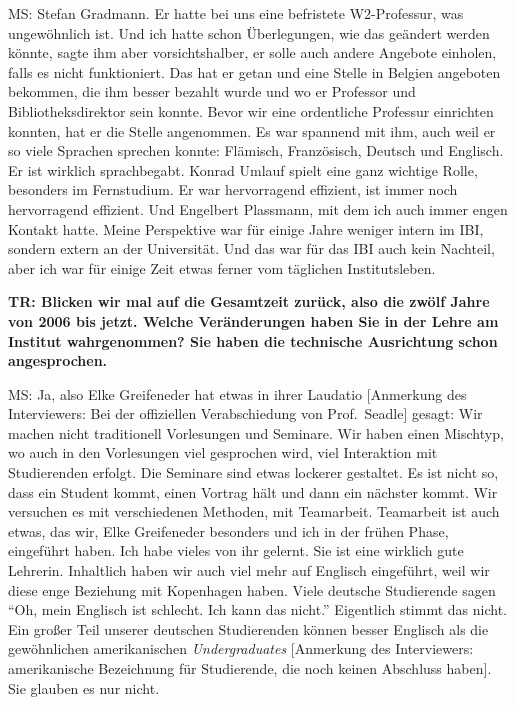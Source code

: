 \documentclass[a4paper,
fontsize=11pt,
oneside,
numbers=noperiodatend,
parskip=half-,
bibliography=totoc,
final
]{scrartcl}
\begin{document}
MS: Stefan Gradmann. Er hatte bei uns eine befristete W2-Professur, was
ungewöhnlich ist. Und ich hatte schon Überlegungen, wie das geändert
werden könnte, sagte ihm aber vorsichtshalber, er solle auch andere
Angebote einholen, falls es nicht funktioniert. Das hat er getan und
eine Stelle in Belgien angeboten bekommen, die ihm besser bezahlt wurde
und wo er Professor und Bibliotheksdirektor sein konnte. Bevor wir eine
ordentliche Professur einrichten konnten, hat er die Stelle angenommen.
Es war spannend mit ihm, auch weil er so viele Sprachen sprechen konnte:
Flämisch, Französisch, Deutsch und Englisch. Er ist wirklich
sprachbegabt. Konrad Umlauf spielt eine ganz wichtige Rolle, besonders
im Fernstudium. Er war hervorragend effizient, ist immer noch
hervorragend effizient. Und Engelbert Plassmann, mit dem ich auch immer
engen Kontakt hatte. Meine Perspektive war für einige Jahre weniger
intern im IBI, sondern extern an der Universität. Und das war für das
IBI auch kein Nachteil, aber ich war für einige Zeit etwas ferner vom
täglichen Institutsleben.

\textbf{TR: Blicken wir mal auf die Gesamtzeit zurück, also die zwölf
Jahre von 2006 bis jetzt. Welche Veränderungen haben Sie in der Lehre am
Institut wahrgenommen? Sie haben die technische Ausrichtung schon
angesprochen.}

MS: Ja, also Elke Greifeneder hat etwas in ihrer Laudatio {[}Anmerkung
des Interviewers: Bei der offiziellen Verabschiedung von Prof.~Seadle{]}
gesagt: Wir machen nicht traditionell Vorlesungen und Seminare. Wir
haben einen Mischtyp, wo auch in den Vorlesungen viel gesprochen wird,
viel Interaktion mit Studierenden erfolgt. Die Seminare sind etwas
lockerer gestaltet. Es ist nicht so, dass ein Student kommt, einen
Vortrag hält und dann ein nächster kommt. Wir versuchen es mit
verschiedenen Methoden, mit Teamarbeit. Teamarbeit ist auch etwas, das
wir, Elke Greifeneder besonders und ich in der frühen Phase, eingeführt
haben. Ich habe vieles von ihr gelernt. Sie ist eine wirklich gute
Lehrerin. Inhaltlich haben wir auch viel mehr auf Englisch eingeführt,
weil wir diese enge Beziehung mit Kopenhagen haben. Viele deutsche
Studierende sagen \enquote{Oh, mein Englisch ist schlecht. Ich kann das
nicht.} Eigentlich stimmt das nicht. Ein großer Teil unserer deutschen
Studierenden können besser Englisch als die gewöhnlichen amerikanischen
\emph{Undergraduates} {[}Anmerkung des Interviewers: amerikanische
Bezeichnung für Studierende, die noch keinen Abschluss haben{]}. Sie
glauben es nur nicht.
\end{document}

